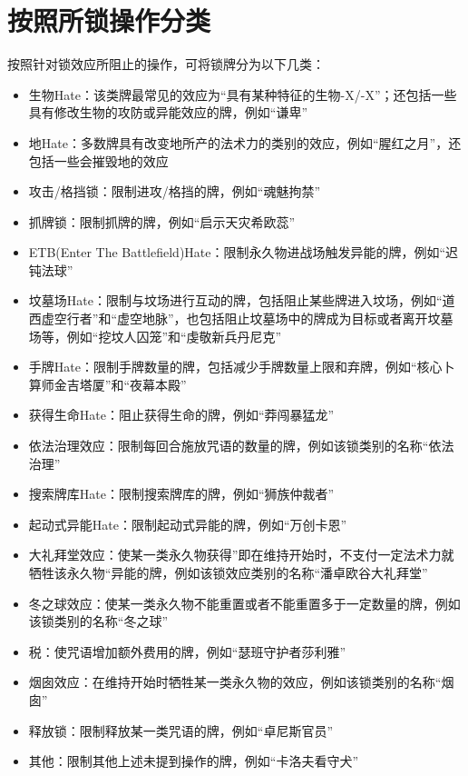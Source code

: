 \documentclass[lang = cn, color = black, 10pt]{AllThatStax}
\begin{document}
\section*{按照所锁操作分类}

按照针对锁效应所阻止的操作，可将锁牌分为以下几类：

\begin{itemize}
    \item 生物Hate：该类牌最常见的效应为“具有某种特征的生物-X/-X”；还包括一些具有修改生物的攻防或异能效应的牌，例如“谦卑”
    \item 地Hate：多数牌具有改变地所产的法术力的类别的效应，例如“腥红之月”，还包括一些会摧毁地的效应
    \item 攻击/格挡锁：限制进攻/格挡的牌，例如“魂魅拘禁”
    \item 抓牌锁：限制抓牌的牌，例如“启示天灾希欧蕊”
    \item ETB(Enter The Battlefield)Hate：限制永久物进战场触发异能的牌，例如“迟钝法球”
    \item 坟墓场Hate：限制与坟场进行互动的牌，包括阻止某些牌进入坟场，例如“道西虚空行者”和“虚空地脉”，也包括阻止坟墓场中的牌成为目标或者离开坟墓场等，例如“挖坟人囚笼”和“虔敬新兵丹尼克”
    \item 手牌Hate：限制手牌数量的牌，包括减少手牌数量上限和弃牌，例如“核心卜算师金吉塔厦”和“夜幕本殿”
    \item 获得生命Hate：阻止获得生命的牌，例如“莽闯暴猛龙”
    \item 依法治理效应：限制每回合施放咒语的数量的牌，例如该锁类别的名称“依法治理”
    \item 搜索牌库Hate：限制搜索牌库的牌，例如“狮族仲裁者”
    \item 起动式异能Hate：限制起动式异能的牌，例如“万创卡恩”
    \item 大礼拜堂效应：使某一类永久物获得”即在维持开始时，不支付一定法术力就牺牲该永久物“异能的牌，例如该锁效应类别的名称“潘卓欧谷大礼拜堂”
    \item 冬之球效应：使某一类永久物不能重置或者不能重置多于一定数量的牌，例如该锁类别的名称“冬之球”
    \item 税：使咒语增加额外费用的牌，例如“瑟班守护者莎利雅”
    \item 烟囱效应：在维持开始时牺牲某一类永久物的效应，例如该锁类别的名称“烟囱”
    \item 释放锁：限制释放某一类咒语的牌，例如“卓尼斯官员”
    \item 其他：限制其他上述未提到操作的牌，例如“卡洛夫看守犬”
\end{itemize}
\end{document}
